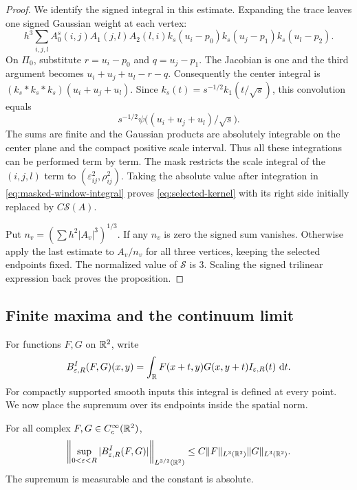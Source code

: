 \begin{proof}
We identify the signed integral in this estimate. Expanding the trace
leaves one signed Gaussian weight at each vertex:
\[
 h^3\sum_{i,j,l}A_0^s(i,j)A_1(j,l)A_2(l,i)
       k_s(u_i-p_0)k_s(u_j-p_1)k_s(u_l-p_2).
\]
On $\Pi_0$, substitute $r=u_i-p_0$ and $q=u_j-p_1$.
The Jacobian is one and the third argument becomes
$u_i+u_j+u_l-r-q$. Consequently the center integral is
$(k_s*k_s*k_s)(u_i+u_j+u_l)$. Since
$k_s(t)=s^{-1/2}k_1(t/\sqrt{s})$, this convolution equals
\[
 s^{-1/2}\psi\bigl((u_i+u_j+u_l)/\sqrt{s}\bigr).
\]
The sums are finite and the Gaussian products are absolutely integrable
on the center plane and the compact positive scale interval. Thus all
these integrations can be performed term by term. The mask restricts the
scale integral of the $(i,j,l)$ term to
$(\varepsilon_{ij}^2,\rho_{ij}^2)$. Taking the absolute value after
integration in \eqref{eq:masked-window-integral} proves
\eqref{eq:selected-kernel} with its right side initially replaced by
$C\mathcal S(A)$.

Put $n_v=(\sum h^2|A_v|^3)^{1/3}$. If any $n_v$ is zero the signed sum
vanishes. Otherwise apply the last estimate to $A_v/n_v$ for all three
vertices, keeping the selected endpoints fixed. The normalized value of
$\mathcal S$ is $3$. Scaling the signed trilinear expression back proves
the proposition.
\end{proof}

\subsection{Finite maxima and the continuum limit}

For functions $F,G$ on $\mathbb R^2$, write
\[
 B^I_{\varepsilon,R}(F,G)(x,y)
   =\int_\mathbb R F(x+t,y)G(x,y+t)I_{\varepsilon,R}(t)\,\mathop{}\!\mathrm d t.
\]
For compactly supported smooth inputs this integral is defined at every
point. We now place the supremum over its endpoints inside the spatial
norm.

\begin{proposition}\label{prop:smooth-kernel-maximal}
For all complex $F,G\in C_c^\infty(\mathbb R^2)$,
\[
 \left\|\sup_{0<\varepsilon<R}
          |B^I_{\varepsilon,R}(F,G)|\right\|_{L^{3/2}(\mathbb R^2)}
 \le C\|F\|_{L^3(\mathbb R^2)}\|G\|_{L^3(\mathbb R^2)}.
\]
The supremum is measurable and the constant is absolute.
\end{proposition}

